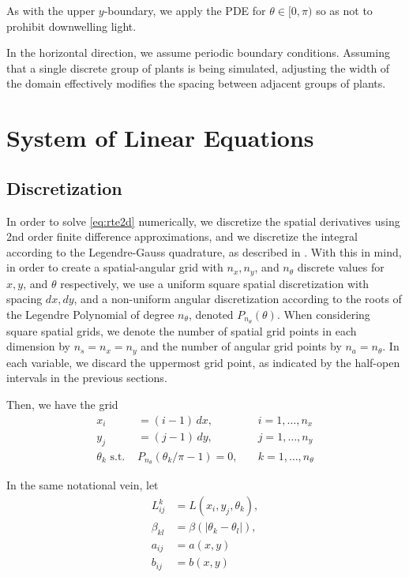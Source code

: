 \documentclass[10pt]{article}
\newcommand\abs[1]{\left| #1 \right|}
\begin{document}
\begin{multicols}{2}
As with the upper $y$-boundary, we apply the PDE for $\theta \in [0,\pi)$ so as not to prohibit downwelling light.

In the horizontal direction, we assume periodic boundary conditions.
Assuming that a single discrete group of plants is being simulated, adjusting the width of the domain effectively modifies the spacing between adjacent groups of plants.

\section{System of Linear Equations}

\subsection{Discretization}
In order to solve \eqref{eq:rte2d} numerically, we discretize the spatial derivatives using 2nd order finite difference approximations, and we discretize the integral according to the Legendre-Gauss quadrature, as described in \citet[Chapter 2]{chandrasekhar_radiative_1960}.
With this in mind, in order to create a spatial-angular grid with $n_x,n_y$, and $n_\theta$ discrete values for $x, y$, and $\theta$ respectively, we use a uniform square spatial discretization with spacing $dx, dy$, and a non-uniform angular discretization according to the roots of the Legendre Polynomial of degree $n_\theta$, denoted $P_{n_\theta}(\theta)$.
When considering square spatial grids, we denote the number of spatial grid points in each dimension by $n_s=n_x=n_y$ and the number of angular grid points by $n_a=n_\theta$.
In each variable, we discard the uppermost grid point, as indicated by the half-open intervals in the previous sections.

Then, we have the grid
\begin{align}
    x_i &= (i-1)\,dx, &\quad i=1,\ldots,n_x \\
    y_j &= (j-1)\,dy, &\quad j=1,\ldots,n_y \\
    \theta_k \,\, \mbox{s.t.}\,\,
    &P_{n_\theta}(\theta_k/\pi-1) = 0, &\quad k=1,\ldots,n_\theta
\end{align}

In the same notational vein, let \\[-1em]
\begin{align}
    L_{ij}^k &= L(x_i,y_j,\theta_k), \\
    \beta_{kl} &= \beta(\abs{\theta_k-\theta_l}), \\
    a_{ij} &= a(x,y) \\
    b_{ij} &= b(x,y)
\end{align}


\end{multicols}
\end{document}
